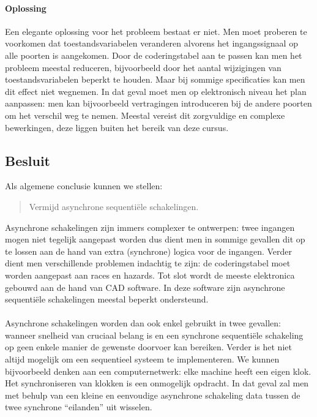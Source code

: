 \paragraph{Oplossing}
Een elegante oplossing voor het probleem bestaat er niet. Men moet proberen te voorkomen dat toestandsvariabelen veranderen alvorens het ingangssignaal op alle poorten is aangekomen. Door de coderingstabel aan te passen kan men het probleem meestal reduceren, bijvoorbeeld door het aantal wijzigingen van toestandsvariabelen beperkt te houden. Maar bij sommige specificaties kan men dit effect niet wegnemen. In dat geval moet men op elektronisch niveau het plan aanpassen: men kan bijvoorbeeld vertragingen introduceren bij de andere poorten om het verschil weg te nemen. Meestal vereist dit zorgvuldige en complexe bewerkingen, deze liggen buiten het bereik van deze cursus.
\subsection{Besluit}
Als algemene conclusie kunnen we stellen:
\begin{quote}
Vermijd asynchrone sequenti\"ele schakelingen.
\end{quote}
Asynchrone schakelingen zijn immers complexer te ontwerpen: twee ingangen mogen niet tegelijk aangepast worden dus dient men in sommige gevallen dit op te lossen aan de hand van extra (synchrone) logica voor de ingangen. Verder dient men verschillende problemen indachtig te zijn: de coderingstabel moet worden aangepast aan races en hazards. Tot slot wordt de meeste elektronica gebouwd aan de hand van CAD software. In deze software zijn asynchrone sequenti\"ele schakelingen meestal beperkt ondersteund.
\paragraph{}
Asynchrone schakelingen worden dan ook enkel gebruikt in twee gevallen: wanneer snelheid van cruciaal belang is en een synchrone sequenti\"ele schakeling op geen enkele manier de gewenste doorvoer kan bereiken. Verder is het niet altijd mogelijk om een sequentieel systeem te implementeren. We kunnen bijvoorbeeld denken aan een computernetwerk: elke machine heeft een eigen klok. Het synchroniseren van klokken is een onmogelijk opdracht. In dat geval zal men met behulp van een kleine en eenvoudige asynchrone schakeling data tussen de twee synchrone ``eilanden'' uit wisselen.
